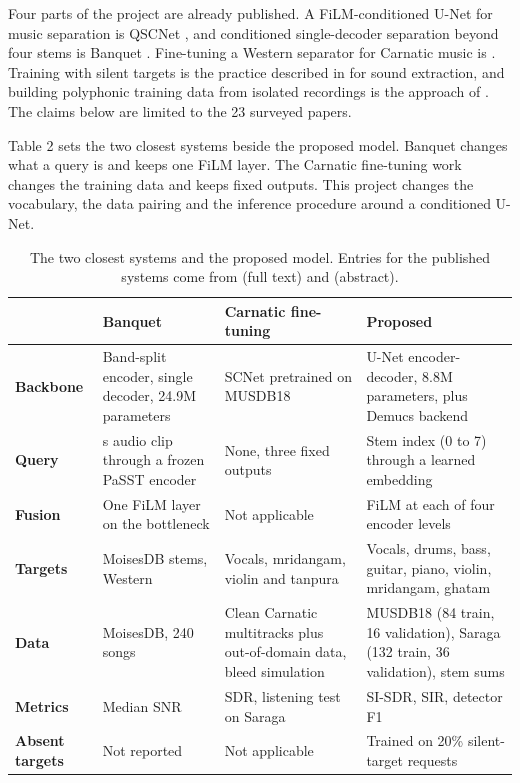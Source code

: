 \documentclass[12pt,a4paper]{article}
\begin{document}
Four parts of the project are already published. A FiLM-conditioned U-Net for music separation is QSCNet \cite{qscnet}, and conditioned single-decoder separation beyond four stems is Banquet \cite{banquet}. Fine-tuning a Western separator for Carnatic music is \cite{carnaticft}. Training with silent targets is the practice described in \cite{pmq} for sound extraction, and building polyphonic training data from isolated recordings is the approach of \cite{persian}. The claims below are limited to the 23 surveyed papers.

Table 2 sets the two closest systems beside the proposed model. Banquet changes what a query is and keeps one FiLM layer. The Carnatic fine-tuning work changes the training data and keeps fixed outputs. This project changes the vocabulary, the data pairing and the inference procedure around a conditioned U-Net.

\begingroup\small\renewcommand{\arraystretch}{1.15}
\begin{table}[ht]\centering
\caption{The two closest systems and the proposed model. Entries for the published systems come from \cite{banquet} (full text) and \cite{carnaticft} (abstract).}\label{tab:closest}
\begin{tabular}{@{}>{\raggedright\arraybackslash}p{2.1cm}>{\raggedright\arraybackslash}p{4.2cm}>{\raggedright\arraybackslash}p{4.2cm}>{\raggedright\arraybackslash}p{4.4cm}@{}}
\toprule
 & \textbf{Banquet \cite{banquet}} & \textbf{Carnatic fine-tuning \cite{carnaticft}} & \textbf{Proposed} \\ \midrule
\textbf{Backbone} & Band-split encoder, single decoder, 24.9M parameters & SCNet pretrained on MUSDB18 & U-Net encoder-decoder, 8.8M parameters, plus Demucs backend \\[0.3em]
\textbf{Query} & 10 s audio clip through a frozen PaSST encoder & None, three fixed outputs & Stem index (0 to 7) through a learned embedding \\[0.3em]
\textbf{Fusion} & One FiLM layer on the bottleneck & Not applicable & FiLM at each of four encoder levels \\[0.3em]
\textbf{Targets} & MoisesDB stems, Western & Vocals, mridangam, violin and tanpura & Vocals, drums, bass, guitar, piano, violin, mridangam, ghatam \\[0.3em]
\textbf{Data} & MoisesDB, 240 songs & Clean Carnatic multitracks plus out-of-domain data, bleed simulation & MUSDB18 (84 train, 16 validation), Saraga (132 train, 36 validation), stem sums \\[0.3em]
\textbf{Metrics} & Median SNR & SDR, listening test on Saraga & SI-SDR, SIR, detector F1 \\[0.3em]
\textbf{Absent targets} & Not reported & Not applicable & Trained on 20\% silent-target requests \\[0.3em]
\bottomrule\end{tabular}\end{table}\endgroup
\end{document}
